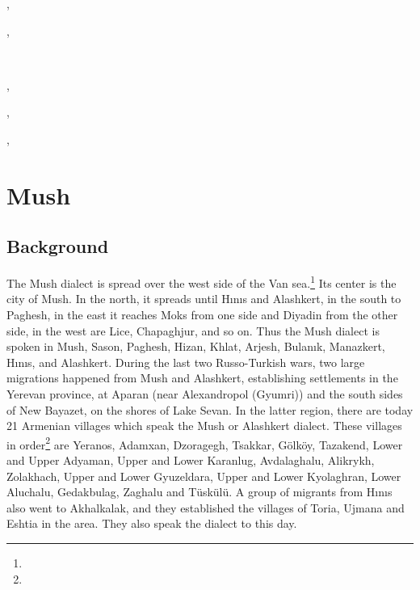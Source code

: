 ,

,


~ 


,

,

,



\fussy


\chapter{Mush}\label{chapter:Mush}
\section{Background}

\begin{adjarianpage}\label{page:116}\end{adjarianpage}%

 

The Mush dialect is spread over the west side of the Van sea.\footnote{} Its center is the city of Mush. In the north, it spreads until Hınıs and Alashkert, in the south to Paghesh, in the east it reaches Moks from one side and Diyadin from the other side, in the west are Lice, Chapaghjur, and so on. Thus the Mush dialect is spoken in Mush, Sason, Paghesh, Hizan, Khlat, Arjesh, Bulanık, Manazkert, Hınıs, and Alashkert. During the last two Russo-Turkish wars, two large migrations happened from Mush and Alashkert, establishing settlements in the Yerevan province, at Aparan (near Alexandropol (Gyumri)) and the south sides of New Bayazet, on the shores of Lake Sevan. In the latter region, there are today 21 Armenian villages which speak the Mush or Alashkert dialect. These villages in order\footnote{} are Yeranos, Adamxan, Dzoragegh, Tsakkar, Gölköy, Tazakend, Lower and Upper Adyaman, Upper and Lower Karanlug, Avdalaghalu, Alikrykh, Zolakhach, Upper and Lower Gyuzeldara, Upper and Lower Kyolaghran, Lower Aluchalu, Gedakbulag, Zaghalu and Tüskülü. A group of migrants from Hınıs also went to Akhalkalak, and they established the villages of Toria, Ujmana and Eshtia in the area. They also speak the dialect to this day.


